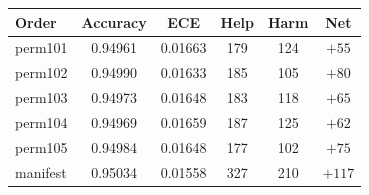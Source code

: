 \footnotesize
\setlength{\tabcolsep}{2.5pt}
\begin{tabular}{lccccc}
\toprule
Order & Accuracy & ECE & Help & Harm & Net \\
\midrule
perm101 & 0.94961 & 0.01663 & 179 & 124 & $+55$ \\
perm102 & 0.94990 & 0.01633 & 185 & 105 & $+80$ \\
perm103 & 0.94973 & 0.01648 & 183 & 118 & $+65$ \\
perm104 & 0.94969 & 0.01659 & 187 & 125 & $+62$ \\
perm105 & 0.94984 & 0.01648 & 177 & 102 & $+75$ \\
manifest & 0.95034 & 0.01558 & 327 & 210 & $+117$ \\
\bottomrule
\end{tabular}
